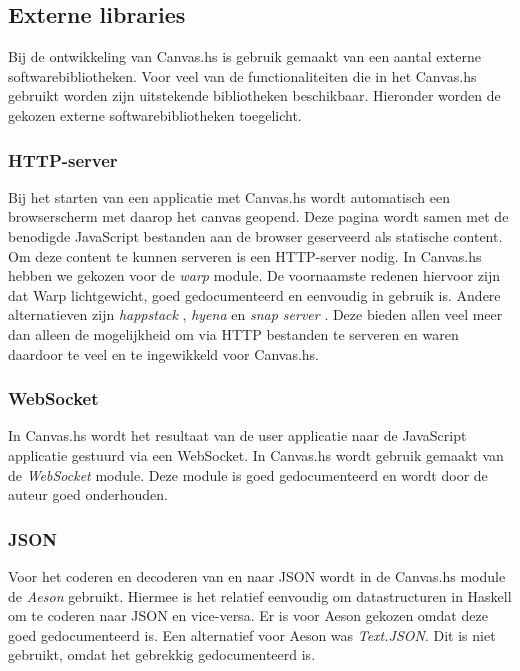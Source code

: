 \subsection{Externe libraries}
\label{subsec:externe_libraries}
Bij de ontwikkeling van Canvas.hs is gebruik gemaakt van een aantal externe softwarebibliotheken. Voor veel van de functionaliteiten die in het Canvas.hs gebruikt worden zijn uitstekende bibliotheken beschikbaar. Hieronder worden de gekozen externe softwarebibliotheken toegelicht.

\subsubsection{HTTP-server}
Bij het starten van een applicatie met Canvas.hs wordt automatisch een browserscherm met daarop het canvas geopend. Deze pagina wordt samen met de benodigde JavaScript bestanden aan de browser geserveerd als statische content. Om deze content te kunnen serveren is een HTTP-server nodig. In Canvas.hs hebben we gekozen voor de \emph{warp} \cite{Warp} module. De voornaamste redenen hiervoor zijn dat Warp lichtgewicht, goed gedocumenteerd en eenvoudig in gebruik is. Andere alternatieven zijn \emph{happstack} \cite{Happstack}, \emph{hyena} \cite{Hyena} en \emph{snap server} \cite{SnapServer}. Deze bieden allen veel meer dan alleen de mogelijkheid om via HTTP bestanden te serveren en waren daardoor te veel en te ingewikkeld voor Canvas.hs.

\subsubsection{WebSocket}
In Canvas.hs wordt het resultaat van de user applicatie naar de JavaScript applicatie gestuurd via een WebSocket. In Canvas.hs wordt gebruik gemaakt van de \emph{WebSocket}  \cite{WebSocket} module. Deze module is goed gedocumenteerd en wordt door de auteur goed onderhouden.

\subsubsection{JSON}
Voor het coderen en decoderen van en naar JSON wordt in de Canvas.hs module de \emph{Aeson} \cite{Aeson} gebruikt. Hiermee is het relatief eenvoudig om datastructuren in Haskell om te coderen naar JSON en vice-versa. Er is voor Aeson gekozen omdat deze goed gedocumenteerd is. Een alternatief voor Aeson was \emph{Text.JSON}. Dit is niet gebruikt, omdat het gebrekkig gedocumenteerd is.

